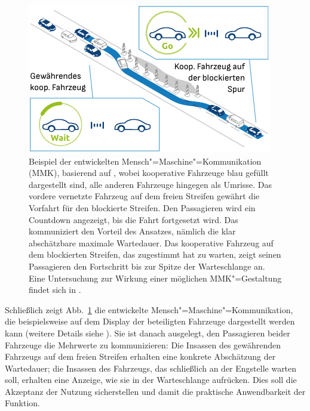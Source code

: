 \begin{figure}[t]%
\includegraphics[width=\columnwidth]{content/bottleneck/images/engstelle-tuev-hmi-2}%
\caption{Beispiel der entwickelten Mensch"=Maschine"=Kommunikation (MMK), basierend auf \citep{ehrhardt2021gap}, wobei kooperative Fahrzeuge blau gefüllt dargestellt sind, alle anderen Fahrzeuge hingegen als Umrisse. Das vordere vernetzte Fahrzeug auf dem freien Streifen gewährt die Vorfahrt für den blockierte Streifen. Den Passagieren wird ein Countdown angezeigt, bis die Fahrt fortgesetzt wird. Das kommuniziert den Vorteil des Ansatzes, nämlich die klar abschätzbare maximale Wartedauer. Das kooperative Fahrzeug auf dem blockierten Streifen, das zugestimmt hat zu warten, zeigt seinen Passagieren den Fortschritt bis zur Spitze der Warteschlange an. Eine Untersuchung zur Wirkung einer möglichen MMK"=Gestaltung findet sich in \citep{ehrhardt2021gap}.}%
\label{fig:hmi}%
\end{figure}




Schließlich zeigt Abb.~\ref{fig:hmi} die entwickelte Mensch"=Maschine"=Kommunikation, die beispielsweise auf dem Display der beteiligten Fahrzeuge dargestellt werden kann (weitere Details siehe \cite{ehrhardt2021gap}). Sie ist danach ausgelegt, den Passagieren beider Fahrzeuge die Mehrwerte zu kommunizieren: Die Insassen des gewährenden Fahrzeugs auf dem freien Streifen erhalten eine konkrete Abschätzung der Wartedauer; die Insassen des Fahrzeugs, das schließlich an der Engstelle warten soll, erhalten eine Anzeige, wie sie in der Warteschlange aufrücken. Dies soll die Akzeptanz der Nutzung sicherstellen und damit die praktische Anwendbarkeit der Funktion.





